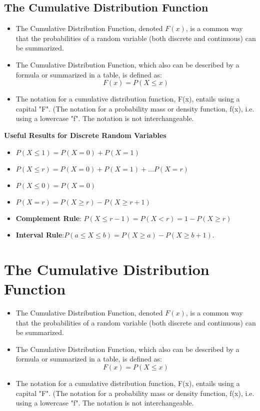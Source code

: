 ﻿\documentclass[]{report}
\begin{document}
\subsection{The Cumulative Distribution Function}
\begin{itemize}
\item The Cumulative Distribution Function, denoted $F(x)$, is a common way that the probabilities
of a random variable (both discrete and continuous) can be summarized.
\item The Cumulative Distribution Function, which also can be
described by a formula or summarized in a table, is defined as:
\[F(x) = P(X \leq x) \]
\item The notation for a cumulative distribution function, F(x), entails using a capital
"F".  (The notation for a probability mass or density function, f(x), i.e. using a lowercase "f". The notation is not interchangeable.
\end{itemize}



\begin{framed}
\textbf{Useful Results for Discrete Random Variables}

\begin{itemize}
\item $P(X \leq 1) = P(X=0) + P(X=1)$
\item $P(X \leq r) = P(X=0)+ P(X=1) + \ldots P(X= r)$
\item $P(X \leq 0) = P(X=0)$
\item $P(X = r) = P(X \geq r ) - P(X \geq r + 1)$
\item \textbf{Complement Rule}: $P(X \leq r-1) = P(X < r) = 1 - P(X \geq r)$
\item \textbf{Interval Rule}:$ P(a \leq X \leq  b)= P(X \geq a) - P(X \geq b + 1).$
\end{itemize}
\end{framed}



\section{The Cumulative Distribution Function}
\begin{itemize}
\item The Cumulative Distribution Function, denoted $F(x)$, is a common way that the probabilities
of a random variable (both discrete and continuous) can be summarized.
\item The Cumulative Distribution Function, which also can be
described by a formula or summarized in a table, is defined as:
\[F(x) = P(X \leq x) \]
\item The notation for a cumulative distribution function, F(x), entails using a capital
"F".  (The notation for a probability mass or density function, f(x), i.e. using a lowercase "f". The notation is not interchangeable.
\end{itemize}
\end{document}
